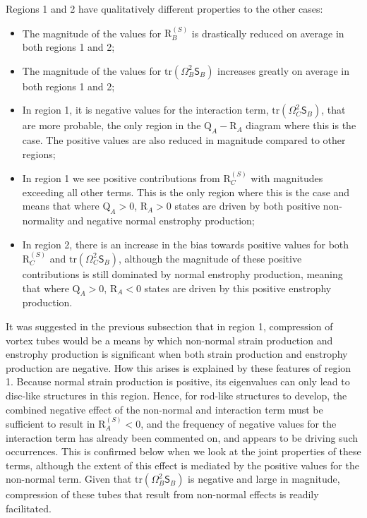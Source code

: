 \documentclass[preprint,amssymb,amsmath,aip,cha]{revtex4-1}
\begin{document}
Regions 1 and 2 have qualitatively different properties to the other cases:
\begin{itemize}
\item The magnitude of the values for $\mbox{R}_{B}^{(S)}$ is drastically reduced on average in both regions 1 and 2;
\item The magnitude of the values for $\mbox{tr}(\mathsf{\Omega}^{2}_{B}\mathsf{S}_{B})$ increases greatly on average in both regions 1 and 2;
\item In region 1, it is negative values for the interaction term, $\mbox{tr}(\mathsf{\Omega}^{2}_{C}\mathsf{S}_{B})$, that are more probable, the only region in the $\mbox{Q}_{A}-\mbox{R}_{A}$ diagram where this is the case. The positive values are also reduced in magnitude compared to other regions;
\item In region 1 we see positive contributions from $\mbox{R}_{C}^{(S)}$ with magnitudes exceeding all other terms. This is the only region where this is the case and means that where $\mbox{Q}_{A} > 0$, $\mbox{R}_{A} > 0$ states are driven by both positive non-normality and negative normal enstrophy production;
\item In region 2, there is an increase in the bias towards positive values for both $\mbox{R}_{C}^{(S)}$ and $\mbox{tr}(\mathsf{\Omega}^{2}_{C}\mathsf{S}_{B})$, although the magnitude of these positive contributions is still dominated by normal enstrophy production, meaning that where $\mbox{Q}_{A} > 0$, $\mbox{R}_{A} < 0$ states are driven by this positive enstrophy production.
\end{itemize}
It was suggested in the previous subsection that in region 1, compression of vortex tubes would be a means by which non-normal strain production and enstrophy production is significant when both strain production and enstrophy production are negative. How this arises is explained by these features of region 1. Because normal strain production is positive, its eigenvalues can only lead to disc-like structures in this region. Hence, for rod-like structures to develop, the combined negative effect of the non-normal and interaction term must be sufficient to result in $\mbox{R}_{A}^{(S)} < 0$, and the frequency of negative values for the interaction term has already been commented on, and appears to be driving such occurrences. This is confirmed below when we look at the joint properties of these terms, although the extent of this effect is mediated by the positive values for the non-normal term. Given that $\mbox{tr}(\mathsf{\Omega}^{2}_{B}\mathsf{S}_{B})$ is negative and large in magnitude, compression of these tubes that result from non-normal effects is readily facilitated.
\end{document}
